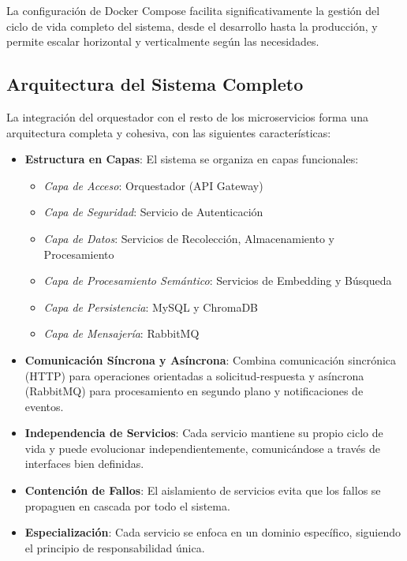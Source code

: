 \documentclass[12pt,a4paper]{article}
\begin{document}
La configuración de Docker Compose facilita significativamente la gestión del ciclo de vida completo del sistema, desde el desarrollo hasta la producción, y permite escalar horizontal y verticalmente según las necesidades.

\subsection{Arquitectura del Sistema Completo}
\label{subsec:os-arquitectura-completa}

La integración del orquestador con el resto de los microservicios forma una arquitectura completa y cohesiva, con las siguientes características:

\begin{itemize}
    \item \textbf{Estructura en Capas}: El sistema se organiza en capas funcionales:
    
    \begin{itemize}
        \item \textit{Capa de Acceso}: Orquestador (API Gateway)
        \item \textit{Capa de Seguridad}: Servicio de Autenticación
        \item \textit{Capa de Datos}: Servicios de Recolección, Almacenamiento y Procesamiento
        \item \textit{Capa de Procesamiento Semántico}: Servicios de Embedding y Búsqueda
        \item \textit{Capa de Persistencia}: MySQL y ChromaDB
        \item \textit{Capa de Mensajería}: RabbitMQ
    \end{itemize}
    
    \item \textbf{Comunicación Síncrona y Asíncrona}: Combina comunicación sincrónica (HTTP) para operaciones orientadas a solicitud-respuesta y asíncrona (RabbitMQ) para procesamiento en segundo plano y notificaciones de eventos.
    
    \item \textbf{Independencia de Servicios}: Cada servicio mantiene su propio ciclo de vida y puede evolucionar independientemente, comunicándose a través de interfaces bien definidas.
    
    \item \textbf{Contención de Fallos}: El aislamiento de servicios evita que los fallos se propaguen en cascada por todo el sistema.
    
    \item \textbf{Especialización}: Cada servicio se enfoca en un dominio específico, siguiendo el principio de responsabilidad única.
\end{itemize}
\end{document}
